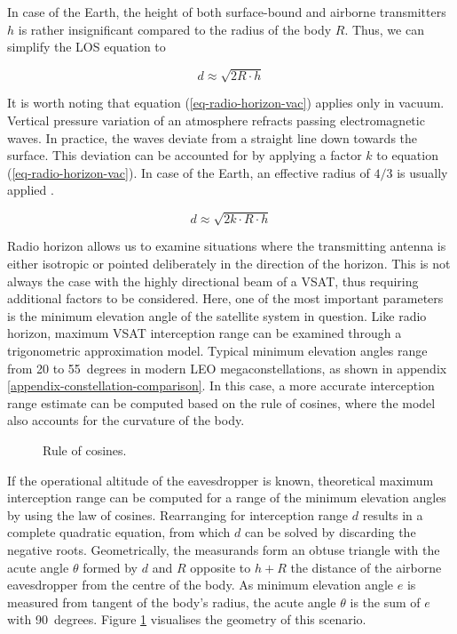 \documentclass[english, 12pt, a4paper, elec, utf8, a-1b, online]{aaltothesis}
\begin{document}
In case of the Earth, the height of both surface-bound and airborne transmitters $h$ is rather insignificant compared to the radius of the body $R$. Thus, we can simplify the LOS equation to

\begin{equation} \label{eq-radio-horizon-vac}
  d \approx \sqrt{2R \cdot h}
\end{equation}

It is worth noting that equation (\ref{eq-radio-horizon-vac}) applies only in vacuum.
Vertical pressure variation of an atmosphere refracts passing electromagnetic waves. In practice, the waves deviate from a straight line down towards the surface. This deviation can be accounted for by applying a factor $k$ to equation (\ref{eq-radio-horizon-vac}). In case of the Earth, an effective radius of $4/3$ is usually applied \cite{seybold2005introduction}.

\begin{equation} \label{eq-radio-horizon-ath}
  d \approx \sqrt{2 k \cdot R \cdot h}
\end{equation}

Radio horizon allows us to examine situations where the transmitting antenna is either isotropic or pointed deliberately in the direction of the horizon.
This is not always the case with the highly directional beam of a VSAT, thus requiring additional factors to be considered.
Here, one of the most important parameters is the minimum elevation angle of the satellite system in question.
Like radio horizon, maximum VSAT interception range can be examined through a trigonometric approximation model.
Typical minimum elevation angles range from 20 to 55~degrees in modern LEO megaconstellations, as shown in appendix \ref{appendix-constellation-comparison}.
In this case, a more accurate interception range estimate can be computed based on the rule of cosines, where the model also accounts for the curvature of the body.

\begin{figure}[h]
  \centering
  
  \caption{Rule of cosines.}
  \label{fig-cosine-rule-interception}
\end{figure}

If the operational altitude of the eavesdropper is known, theoretical maximum interception range can be computed for a range of the minimum elevation angles by using the law of cosines.
Rearranging for interception range $d$ results in a complete quadratic equation, from which $d$ can be solved by discarding the negative roots.
Geometrically, the measurands form an obtuse triangle with the acute angle $\theta$ formed by $d$ and $R$ opposite to $h + R$ the distance of the airborne eavesdropper from the centre of the body.
As minimum elevation angle $e$ is measured from tangent of the body's radius, the acute angle $\theta$ is the sum of $e$ with 90~degrees.
Figure \ref{fig-cosine-rule-interception} visualises the geometry of this scenario.
\end{document}
